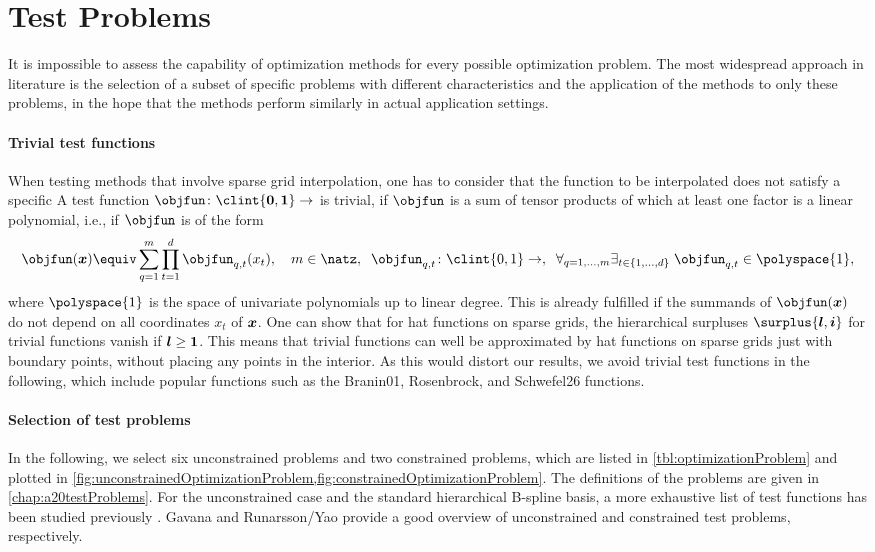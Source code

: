 \section{Test Problems}
\label{sec:53testProblems}

It is impossible to assess the capability of optimization methods
for every possible optimization problem.
The most widespread approach in literature
is the selection of a subset of specific problems
with different characteristics  and
the application of the methods to only these problems,
in the hope that the methods perform similarly in
actual application settings.

\paragraph{Trivial test functions}

When testing methods that involve sparse grid interpolation,
one has to consider that the function to be interpolated
does not satisfy a specific 
A test function $\objfun\colon \clint{\*0, \*1} \to \real$ is trivial, if
$\objfun$ is a sum of tensor products of which at
least one factor is a linear polynomial, i.e., if
$\objfun$ is of the form
\begin{equation}
  \objfun(\*x) \equiv \sum_{q=1}^m \prod_{t=1}^d \objfun_{q,t}(x_t),\quad
  m \in \natz,\;\;
  \objfun_{q,t}\colon \clint{0, 1} \to \real,\;\;
  \faex{q = 1, \dotsc, m}{t \in \{1, \dotsc, d\}}{
    \objfun_{q,t} \in \polyspace{1},
  }
\end{equation}
where $\polyspace{1}$ is the space of univariate polynomials
up to linear degree.
This is already fulfilled if the summands of $\objfun(\*x)$
do not depend on all coordinates $x_t$ of ${\boldsymbol{x}}$.
One can show that for hat functions on sparse grids,
the hierarchical surpluses $\surplus{\*l,\*i}$ for trivial functions
vanish if ${\boldsymbol{l}} \ge {\boldsymbol{1}}$.
This means that trivial functions can well be approximated by hat functions
on sparse grids just with boundary points, without placing any points
in the interior.
As this would distort our results,
we avoid trivial test functions in the following,
which include popular functions such as the
Branin01, Rosenbrock, and Schwefel26 functions.

\paragraph{Selection of test problems}

In the following, we select six unconstrained problems
and two constrained problems, which are listed in
\cref{tbl:optimizationProblem} and plotted in
\cref{fig:unconstrainedOptimizationProblem,fig:constrainedOptimizationProblem}.
The definitions of the problems are given in \cref{chap:a20testProblems}.
For the unconstrained case and the standard hierarchical
B-spline basis, a more exhaustive list of test functions has been
studied previously \cite{Valentin14Hierarchische}.
Gavana \cite{Gavana13Global} and Runarsson/Yao \cite{Runarsson00Stochastic}
provide a good overview of unconstrained and constrained test problems,
respectively.

